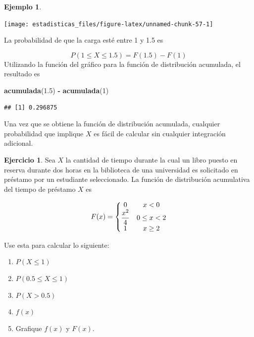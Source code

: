 \documentclass[
  11pt,
]{book}
\newenvironment{Shaded}{\begin{snugshade}}{\end{snugshade}}
\newcommand{\DecValTok}[1]{\textcolor[rgb]{0.00,0.00,0.81}{#1}}
\newcommand{\FloatTok}[1]{\textcolor[rgb]{0.00,0.00,0.81}{#1}}
\newcommand{\FunctionTok}[1]{\textcolor[rgb]{0.13,0.29,0.53}{\textbf{#1}}}
\newcommand{\NormalTok}[1]{#1}
\newcommand{\SpecialCharTok}[1]{\textcolor[rgb]{0.81,0.36,0.00}{\textbf{#1}}}
\providecommand{\tightlist}{%
  \setlength{\itemsep}{0pt}\setlength{\parskip}{0pt}}
\theoremstyle{definition}
\theoremstyle{definition}
\newtheorem{example}{Ejemplo}[chapter]
\theoremstyle{definition}
\newtheorem{exercise}{Ejercicio}[chapter]
\theoremstyle{definition}
\theoremstyle{remark}
\begin{document}
\begin{example}
\begin{center}\texttt{[image: estadisticas\_files/figure-latex/unnamed-chunk-57-1]} \end{center}

La probabilidad de que la carga esté entre 1 y 1.5 es

\[P(1 \leq X \leq 1.5) = F(1.5) - F(1)\]
Utilizando la función del gráfico para la función de distribución acumulada, el resultado es

\begin{Shaded}
\begin{Highlighting}[]
\FunctionTok{acumulada}\NormalTok{(}\FloatTok{1.5}\NormalTok{) }\SpecialCharTok{{-}} \FunctionTok{acumulada}\NormalTok{(}\DecValTok{1}\NormalTok{)}
\end{Highlighting}
\end{Shaded}

\begin{verbatim}
## [1] 0.296875
\end{verbatim}

Una vez que se obtiene la función de distribución acumulada, cualquier probabilidad que implique \(X\) es fácil de calcular sin cualquier integración adicional.
\end{example}

\begin{exercise}

Sea \(X\) la cantidad de tiempo durante la cual un libro puesto en reserva durante dos horas en la biblioteca de una universidad es solicitado en préstamo por un estudiante seleccionado. La función de distribución acumulativa del tiempo de préstamo \(X\) es

\begin{equation}
  \notag
  F(x) = \left\lbrace
  \begin{matrix}
    0 & x<0 \\
    \displaystyle\frac{x^2}{4} & 0\leq x < 2 \\
    1 & x \geq 2\\
  \end{matrix} \right.
\end{equation}

Use esta para calcular lo siguiente:

\begin{enumerate}
\def\labelenumi{\alph{enumi}.}
\tightlist
\item
  \(P(X \leq 1)\)
\item
  \(P(0.5 \leq X \leq 1)\)
\item
  \(P(X > 0.5)\)
\item
  \(f(x)\)
\item
  Grafique \(f(x)\) y \(F(x)\).
\end{enumerate}

\end{exercise}
\end{document}
